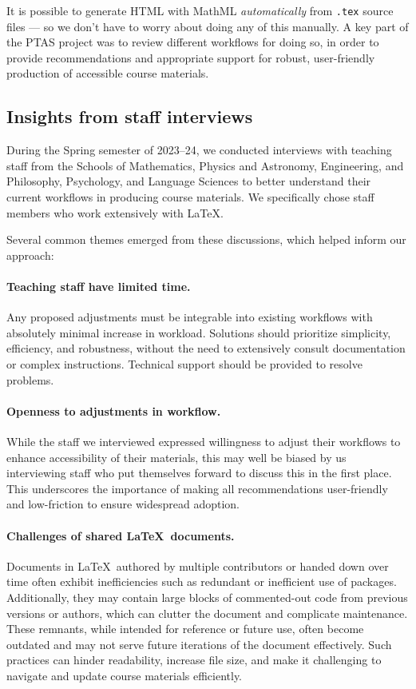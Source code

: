 It is possible to generate HTML with MathML \textit{automatically} from \verb|.tex| source files --- so we don't have to worry about doing any of this manually. A key part of the PTAS project was to review different workflows for doing so, in order to provide recommendations and appropriate support for robust, user-friendly production of accessible course materials.


\subsection{Insights from staff interviews}
\label{sec:interviews}

During the Spring semester of 2023--24, we conducted interviews with teaching staff from the Schools of Mathematics, Physics and Astronomy, Engineering, and Philosophy, Psychology, and Language Sciences to better understand their current workflows in producing course materials. We specifically chose staff members who work extensively with \LaTeX{}.

Several common themes emerged from these discussions, which helped inform our approach:

\paragraph{Teaching staff have limited time.} Any proposed adjustments must be integrable into existing workflows with absolutely minimal increase in workload. Solutions should prioritize simplicity, efficiency, and robustness, without the need to extensively consult documentation or complex instructions. Technical support should be provided to resolve problems.

\paragraph{Openness to adjustments in workflow.} While the staff we interviewed expressed willingness to adjust their workflows to enhance accessibility of their materials, this may well be biased by us interviewing staff who put themselves forward to discuss this in the first place. This underscores the importance of making all recommendations user-friendly and low-friction to ensure widespread adoption.

 \paragraph{Challenges of shared \LaTeX\ documents.} Documents in \LaTeX\ authored by multiple contributors or handed down over time often exhibit inefficiencies such as redundant or inefficient use of packages. Additionally, they may contain large blocks of commented-out code from previous versions or authors, which can clutter the document and complicate maintenance. These remnants, while intended for reference or future use, often become outdated and may not serve future iterations of the document effectively. Such practices can hinder readability, increase file size, and make it challenging to navigate and update course materials efficiently.

